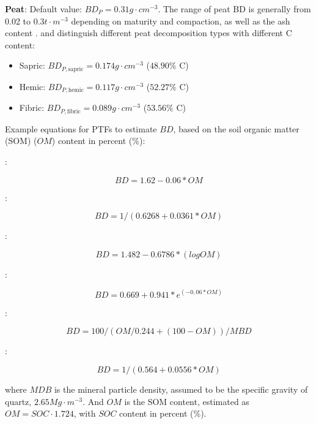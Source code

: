 \documentclass[10pt,b5paper,]{book}
\theoremstyle{definition}
\theoremstyle{definition}
\theoremstyle{definition}
\theoremstyle{remark}
\begin{document}
\textbf{Peat}: Default value: \(BD_{P} = 0.31 g \cdot cm^{-3}\). The
range of peat BD is generally from 0.02 to 0.3\(t \cdot m^{-3}\)
depending on maturity and compaction, as well as the ash content
\citep{agus_measuring_2011}. \citet{batjes1996total} and
\citet{agus_measuring_2011} distinguish different peat decomposition
types with different C content:

\begin{itemize}
\item
  Sapric: \(BD_{P,\text{sapric}} = 0.174 g \cdot cm^{-3}\) (\(48.90\%\)
  C)
\item
  Hemic: \(BD_{P,\text{hemic}} = 0.117 g \cdot cm^{-3}\) (\(52.27\%\) C)
\item
  Fibric: \(BD_{P,\text{fibric}} = 0.089 g \cdot cm^{-3}\) (\(53.56\%\)
  C)
\end{itemize}

Example equations for PTFs to estimate \(BD\), based on the soil organic
matter (SOM) (\(OM\)) content in percent (\%):

\cite{saini_1966_organic}:

\begin{equation}
BD = 1.62-0.06 * OM
\end{equation}

\cite{Drew1973}:

\begin{equation}
BD = 1/(0.6268 + 0.0361 * OM)
\end{equation}

\cite{jeffrey1970note}:

\begin{equation}
BD = 1.482 - 0.6786 * (log OM)
\end{equation}

\cite{Grigal1989}:

\begin{equation}
BD = 0.669 + 0.941 * e^{(-0,06 * OM)}
\end{equation}

\cite{adams1973effect}:

\begin{equation}
BD = 100/(OM/0.244 + (100-OM))/MBD
\end{equation}

\cite{honeysett1989use}:

\begin{equation}
BD = 1/(0.564 + 0.0556*OM)
\end{equation}

where \(MDB\) is the mineral particle density, assumed to be the
specific gravity of quartz, \(2.65 Mg \cdot m^{-3}\). And \(OM\) is the
SOM content, estimated as \(OM = SOC \cdot 1.724\), with \(SOC\) content
in percent (\%).
\end{document}
